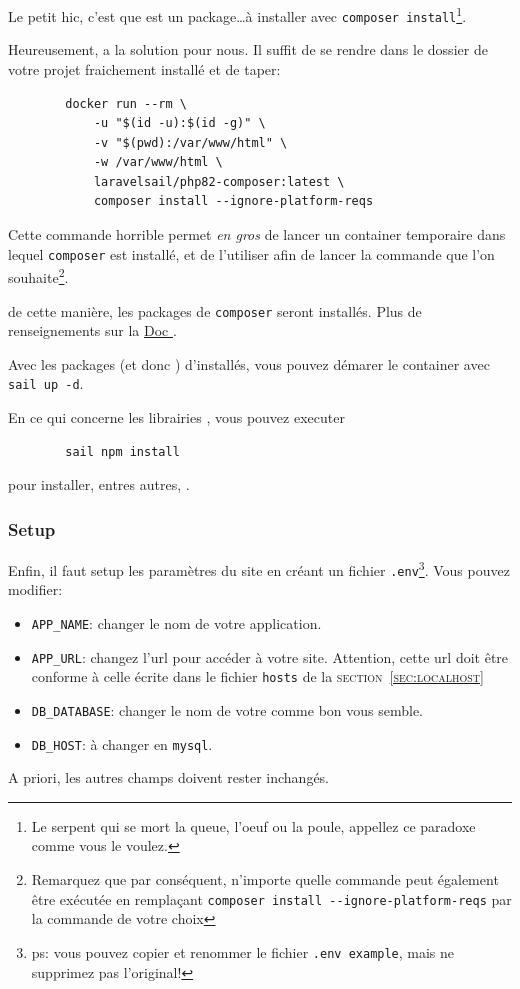     Le petit hic, c'est que \laravelsail{} est un package\ldots à installer avec \verb|composer install|\footnote{Le serpent qui se mort la queue, l'oeuf ou la poule, appellez ce paradoxe comme vous le voulez.}. 

    Heureusement, \laravel{} a la solution pour nous. Il suffit de se rendre dans le dossier de votre projet fraichement installé et de taper:
    \begin{lstlisting}
        docker run --rm \
            -u "$(id -u):$(id -g)" \
            -v "$(pwd):/var/www/html" \
            -w /var/www/html \
            laravelsail/php82-composer:latest \
            composer install --ignore-platform-reqs
    \end{lstlisting}

    Cette commande horrible permet \textit{en gros} de lancer un container temporaire dans lequel \texttt{composer} est installé, et de l'utiliser afin de lancer la commande que l'on souhaite\footnote{Remarquez que par conséquent, n'importe quelle commande \php{} peut également être exécutée en remplaçant \verb|composer install --ignore-platform-reqs| par la commande de votre choix}.

    de cette manière, les packages de \texttt{composer} seront installés. Plus de renseignements sur la \href{https://laravel.com/docs/10.x/sail#installing-composer-dependencies-for-existing-projects}{Doc \laravel}.
    
    Avec les packages (et donc \laravelsail{}) d'installés, vous pouvez démarer le container avec \verb|sail up -d|.

    En ce qui concerne les librairies \js{}, vous pouvez executer 
    \begin{lstlisting}
        sail npm install
    \end{lstlisting}
    pour installer, entres autres, \vite.

    \subsubsection[Setup]{Setup}
    Enfin, il faut setup les paramètres du site en créant un fichier \verb|.env|\footnote{ps: vous pouvez copier et renommer le fichier \verb|.env example|, mais ne supprimez pas l'original!}. Vous pouvez modifier:

    \begin{itemize}
        \item \verb|APP_NAME|: changer le nom de votre application.
        \item \verb|APP_URL|: changez l'url pour accéder à votre site. Attention, cette url doit être conforme à celle écrite dans le fichier \verb|hosts| de la \textsc{section~\ref{sec:localhost}}
        \item \verb|DB_DATABASE|: changer le nom de votre \db{} comme bon vous semble.
        \item \verb|DB_HOST|: à changer en \verb|mysql|.
    \end{itemize}
    A priori, les autres champs doivent rester inchangés.

